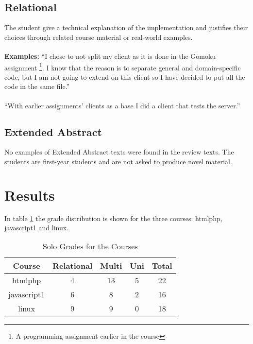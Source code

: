 \documentclass[twoside,twocolumn,a4paper,11pt,english]{article}
\begin{document}
\subsection{Relational}

The student give a technical explanation of the implementation and justifies their choices through related course material or real-world examples.
\\
\\
\textbf{Examples:} ``I chose to not split my client as it is done in the Gomoku assignment \footnote{A programming assignment earlier in the course}. I know that the reason is to separate general and domain-specific code, but I am not going to extend on this client so I have decided to put all the code in the same file.''
\\
\\
``With earlier assignments' clients as a base I did a client that tests the server.''

\subsection{Extended Abstract}

No examples of Extended Abstract texts were found in the review texts. The students are first-year students and are not asked to produce novel material.




\section{Results}

In table \ref{table:solo} the grade distribution is shown for the three courses: htmlphp, javascript1 and linux.

\begin{table}[H]
\caption{Solo Grades for the Courses}
\centering
\begin{tabular}{c | c c c | c}
Course & Relational & Multi & Uni & Total  \\ [0.5ex] %
\hline
htmlphp & 4 & 13 & 5 & 22 \\
javascript1 & 6 & 8 & 2 & 16\\
linux & 9 & 9 & 0 & 18 \\ [1ex]
\end{tabular}
\label{table:solo}
\end{table}
\end{document}
